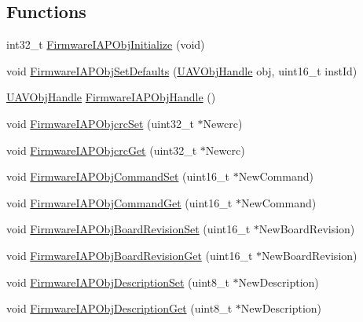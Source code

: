 \subsection*{\-Functions}
\begin{DoxyCompactItemize}
\item 
int32\-\_\-t \hyperlink{group___firmware_i_a_p_obj_ga088fa2fbe5be2b6c3f5cee32ef1503f8}{\-Firmware\-I\-A\-P\-Obj\-Initialize} (void)
\item 
void \hyperlink{group___firmware_i_a_p_obj_ga846e7145fa7e308315891c0a1b2c5ed1}{\-Firmware\-I\-A\-P\-Obj\-Set\-Defaults} (\hyperlink{targets_2_u_a_v_objects_2inc_2uavobjectmanager_8h_a279053e22be53ce9f895043aaeb91e3b}{\-U\-A\-V\-Obj\-Handle} obj, uint16\-\_\-t inst\-Id)
\item 
\hyperlink{targets_2_u_a_v_objects_2inc_2uavobjectmanager_8h_a279053e22be53ce9f895043aaeb91e3b}{\-U\-A\-V\-Obj\-Handle} \hyperlink{group___firmware_i_a_p_obj_gafa74ad6aacc3bce86d763a0c9ebd9910}{\-Firmware\-I\-A\-P\-Obj\-Handle} ()
\item 
void \hyperlink{group___firmware_i_a_p_obj_ga771e7701f85711b73f27b58075d87329}{\-Firmware\-I\-A\-P\-Objcrc\-Set} (uint32\-\_\-t $\ast$\-Newcrc)
\item 
void \hyperlink{group___firmware_i_a_p_obj_ga27c8b04cb56b11589cc45b3735d84c11}{\-Firmware\-I\-A\-P\-Objcrc\-Get} (uint32\-\_\-t $\ast$\-Newcrc)
\item 
void \hyperlink{group___firmware_i_a_p_obj_gac28bc39e19491f81fa4f19a41ec6f129}{\-Firmware\-I\-A\-P\-Obj\-Command\-Set} (uint16\-\_\-t $\ast$\-New\-Command)
\item 
void \hyperlink{group___firmware_i_a_p_obj_gad913f2ea9eb65eb24e8da83182041471}{\-Firmware\-I\-A\-P\-Obj\-Command\-Get} (uint16\-\_\-t $\ast$\-New\-Command)
\item 
void \hyperlink{group___firmware_i_a_p_obj_gaa059eab97b0b627d7e3008902131ebbb}{\-Firmware\-I\-A\-P\-Obj\-Board\-Revision\-Set} (uint16\-\_\-t $\ast$\-New\-Board\-Revision)
\item 
void \hyperlink{group___firmware_i_a_p_obj_ga2a4b3826e77457f25c824dd808a58a50}{\-Firmware\-I\-A\-P\-Obj\-Board\-Revision\-Get} (uint16\-\_\-t $\ast$\-New\-Board\-Revision)
\item 
void \hyperlink{group___firmware_i_a_p_obj_gac5b73e2e4886934490edaca30af467e1}{\-Firmware\-I\-A\-P\-Obj\-Description\-Set} (uint8\-\_\-t $\ast$\-New\-Description)
\item 
void \hyperlink{group___firmware_i_a_p_obj_ga7ef5c8c4253ae19711ad50c493cb74aa}{\-Firmware\-I\-A\-P\-Obj\-Description\-Get} (uint8\-\_\-t $\ast$\-New\-Description)

\end{DoxyCompactItemize}
